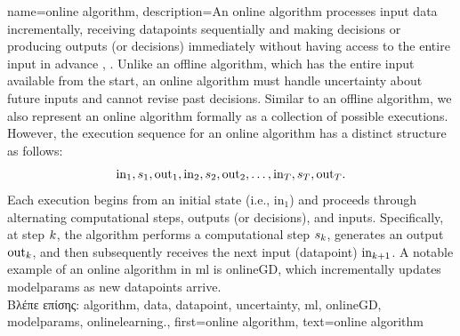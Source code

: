 {name={online algorithm},
	description={An online \gls{algorithm} processes input \gls{data} incrementally, 
		receiving \gls{datapoint}s sequentially and making decisions or producing outputs (or decisions) immediately 
		without having access to the entire input in advance \cite{PredictionLearningGames}, \cite{HazanOCO}. 
		Unlike an offline \gls{algorithm}, which has the entire input available from the start, an online \gls{algorithm} 
		must handle \gls{uncertainty} about future inputs and cannot revise past decisions. Similar to an 
		offline \gls{algorithm}, we also represent an online \gls{algorithm} formally as a collection of possible 
		executions. However, the execution sequence for an online \gls{algorithm} has a distinct structure as follows:
		$${\rm in}_{1}, s_1, {\rm out}_{1}, {\rm in}_{2}, s_2, {\rm out}_{2}, \ldots, {\rm in}_{T}, s_T, {\rm out}_{T}.$$ 
		Each execution begins from an initial state (i.e., \(\text{in}_{1}\)) and proceeds through alternating 
		computational steps, outputs (or decisions), and inputs. Specifically, at step \(k\), 
		the \gls{algorithm} performs a computational step \(s_{k}\), generates an output \(\text{out}_{k}\), 
		and then subsequently receives the next input (\gls{datapoint}) \(\text{in}_{k+1}\). A 
		notable example of an online \gls{algorithm} in \gls{ml} is \gls{onlineGD}, which incrementally 
		updates \gls{modelparams} as new \gls{datapoint}s arrive. 
					\\ 
		\foreignlanguage{greek}{Βλέπε επίσης:} \gls{algorithm}, \gls{data}, \gls{datapoint}, \gls{uncertainty}, \gls{ml}, 
		\gls{onlineGD}, \gls{modelparams}, \gls{onlinelearning}.},
	first={online algorithm},
	text={online algorithm} 
}


